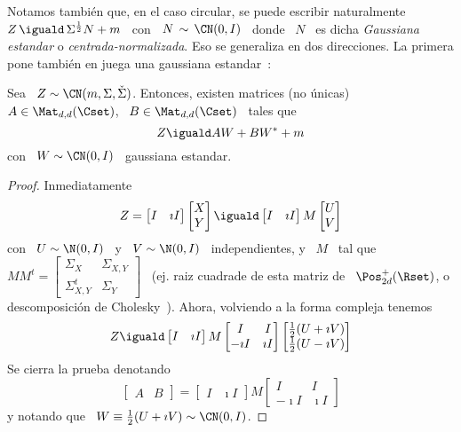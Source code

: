 Notamos tambi\'en que, en el caso  circular, se puede escribir naturalmente \ $Z
\, \iguald \, \Sigma^{\frac12} N + m$ \  con \ $N \, \sim \, \CN(0,I)$ \ donde \
$N$ \  es dicha  {\em Gaussiana estandar}  o {\em centrada-normalizada}.   Eso se
generaliza en dos direcciones.  La  primera pone tambi\'en en juega una gaussiana
estandar~\cite{Lap17}:
%
\begin{teorema}
\label{Teo:MP:GaussianaComplejaWWestrella}
%
Sea \  $Z \sim  \CN(m,\Sigma,\check{\Sigma})$.  Entonces, existen  matrices (no
\'unicas) \ $A \in \Mat_{d,d}(\Cset)$, \ $B \in \Mat_{d,d}(\Cset)$ \ tales que
  \[
  Z \iguald A W + B W^* + m
  \]
  con \ $W \sim \CN(0,I)$ \ gaussiana estandar.
\end{teorema}
\begin{proof}
  Inmediatamente
  \[
  Z   =  \begin{bmatrix}   I   &  \imath   I\end{bmatrix}  \begin{bmatrix}   X\\
    Y\end{bmatrix}
  \iguald \begin{bmatrix} I & \imath I\end{bmatrix} M \begin{bmatrix} U\\
    V\end{bmatrix}
  \]
  con \ $U \sim \N(0,I)$ \ y \  $V \sim \N(0,I)$ \ independientes, y \ $M$ \ tal
  que  \ $M  M^t =  \begin{bmatrix} \Sigma_X  & \Sigma_{X,Y}  \\  \Sigma_{X,Y}^t &
    \Sigma_Y  \end{bmatrix}$  \   (ej.  raiz  cuadrade  de  esta   matriz  de  \
  $\Pos_{2d}^+(\Rset)$,    o     descomposici\'on    de    Cholesky~\cite{HorJoh13,
    Bha07}). Ahora, volviendo a la forma compleja tenemos
  \[
  Z     \iguald   \begin{bmatrix}    I   &   \imath   I\end{bmatrix}
  M \begin{bmatrix} I  & I\\ -\imath I &  \imath I \end{bmatrix} \begin{bmatrix}
    \frac12 (U + \imath V)\\ \frac12 (U - \imath V)\end{bmatrix}
  \]
  Se cierra la prueba denotando
  \[
  \begin{bmatrix}   A   &   B\end{bmatrix}   =  \begin{bmatrix} I &
    \imath  I\end{bmatrix}  M  \begin{bmatrix}  I  &  I\\  -\imath  I  &  \imath
    I \end{bmatrix}
  \]
  y notando que \ $W \equiv \frac12 (U + \imath V) \sim \CN(0,I)$.
\end{proof}
